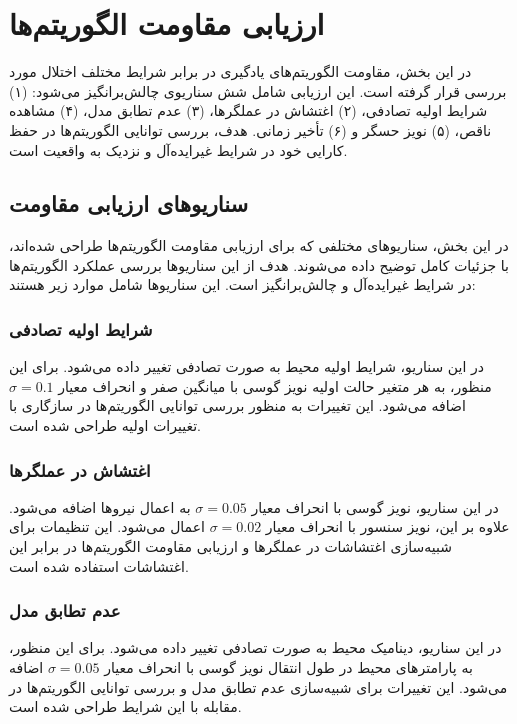 
\section{ارزیابی مقاومت الگوریتم‌ها}
\label{sec:robustness_evaluation}

در این بخش، مقاومت الگوریتم‌های یادگیری در برابر شرایط مختلف اختلال مورد بررسی قرار گرفته است. این ارزیابی شامل شش سناریوی چالش‌برانگیز می‌شود: (۱) شرایط اولیه تصادفی، (۲) اغتشاش در عملگرها، (۳) عدم تطابق مدل، (۴) مشاهده ناقص، (۵) نویز حسگر و (۶) تأخیر زمانی. هدف، بررسی توانایی الگوریتم‌ها در حفظ کارایی خود در شرایط غیرایده‌آل و نزدیک به واقعیت است.

\subsection{سناریوهای ارزیابی مقاومت}

در این بخش، سناریوهای مختلفی که برای ارزیابی مقاومت الگوریتم‌ها طراحی شده‌اند، با جزئیات کامل توضیح داده می‌شوند. هدف از این سناریوها بررسی عملکرد الگوریتم‌ها در شرایط غیرایده‌آل و چالش‌برانگیز است. این سناریوها شامل موارد زیر هستند:

\subsubsection{شرایط اولیه تصادفی}
در این سناریو، شرایط اولیه محیط به صورت تصادفی تغییر داده می‌شود. برای این منظور، به هر متغیر حالت اولیه نویز گوسی با میانگین صفر و انحراف معیار $\sigma = 0.1$ اضافه می‌شود. این تغییرات به منظور بررسی توانایی الگوریتم‌ها در سازگاری با تغییرات اولیه طراحی شده است.

\subsubsection{اغتشاش در عملگرها}
در این سناریو، نویز گوسی با انحراف معیار $\sigma = 0.05$ به اعمال نیروها اضافه می‌شود. علاوه بر این، نویز سنسور با انحراف معیار $\sigma = 0.02$ اعمال می‌شود. این تنظیمات برای شبیه‌سازی اغتشاشات در عملگرها و ارزیابی مقاومت الگوریتم‌ها در برابر این اغتشاشات استفاده شده است.

\subsubsection{عدم تطابق مدل}
در این سناریو، دینامیک محیط به صورت تصادفی تغییر داده می‌شود. برای این منظور، به پارامترهای محیط در طول انتقال نویز گوسی با انحراف معیار $\sigma = 0.05$ اضافه می‌شود. این تغییرات برای شبیه‌سازی عدم تطابق مدل و بررسی توانایی الگوریتم‌ها در مقابله با این شرایط طراحی شده است.

